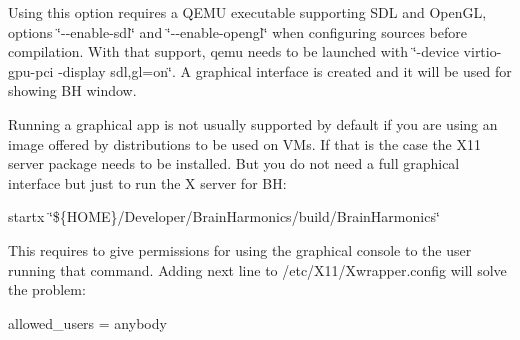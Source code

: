 Using this option requires a Q\+E\+MU executable supporting S\+DL and Open\+GL, options \char`\"{}-\/-\/enable-\/sdl\char`\"{} and \char`\"{}-\/-\/enable-\/opengl\char`\"{} when configuring sources before compilation. With that support, qemu needs to be launched with \char`\"{}-\/device virtio-\/gpu-\/pci -\/display sdl,gl=on\char`\"{}. A graphical interface is created and it will be used for showing BH window.

Running a graphical app is not usually supported by default if you are using an image offered by distributions to be used on V\+Ms. If that is the case the X11 server package needs to be installed. But you do not need a full graphical interface but just to run the X server for BH\+:

startx \char`\"{}\$\{\+H\+O\+M\+E\}/\+Developer/\+Brain\+Harmonics/build/\+Brain\+Harmonics\char`\"{}

This requires to give permissions for using the graphical console to the user running that command. Adding next line to /etc/\+X11/\+Xwrapper.config will solve the problem\+:

allowed\+\_\+users = anybody 